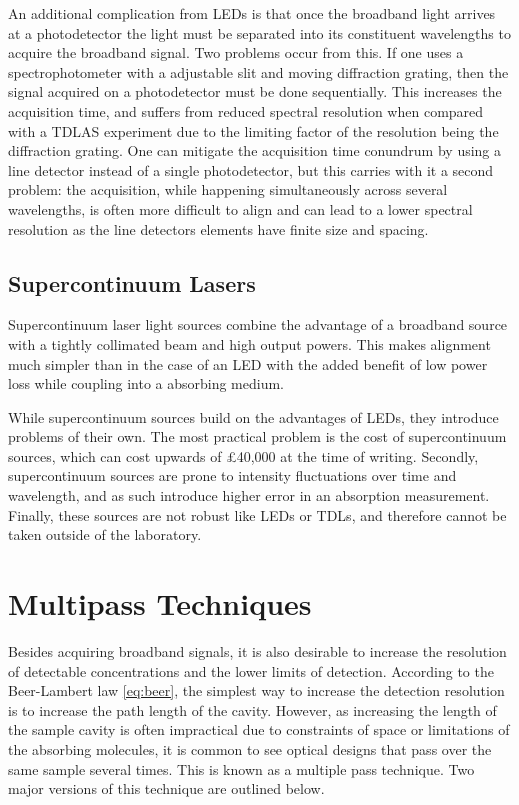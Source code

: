 An additional complication from \acp{LED} is that once the broadband light
arrives at a photodetector the light must be separated into its constituent
wavelengths to acquire the broadband signal.  Two problems occur from this. If
one uses a spectrophotometer with a adjustable slit and moving diffraction
grating, then the signal acquired on a photodetector must be done
sequentially.  This increases the acquisition time, and suffers from reduced
spectral resolution when compared with a \ac{TDLAS} experiment due to the
limiting factor of the resolution being the diffraction grating. One can
mitigate the acquisition time conundrum by using a line detector instead of a
single photodetector, but this carries with it a second problem: the
acquisition, while happening simultaneously across several wavelengths, is
often more difficult to align and can lead to a lower spectral resolution as the line detectors elements have finite size and spacing.

\subsection{Supercontinuum Lasers}\label{subsec:super}

Supercontinuum laser light sources combine the advantage of a broadband source
with a tightly collimated beam and high output powers. This makes alignment
much simpler than in the case of an \ac{LED} with the added benefit of low
power loss while coupling into a absorbing medium.

While supercontinuum sources build on the advantages of \acp{LED}, they
introduce problems of their own. The most practical problem is the cost of
supercontinuum sources, which can cost upwards of \pounds40,000 at the time of
writing. Secondly, supercontinuum sources are prone to intensity fluctuations
over time and wavelength, and as such introduce higher error in an absorption
measurement.  Finally, these sources are not robust like \acp{LED} or
\acp{TDL}, and therefore cannot be taken outside of the laboratory.

\section{Multipass Techniques}\label{sec:multipass}

Besides acquiring broadband signals, it is also desirable to increase the
resolution of detectable concentrations and the lower limits of detection.
According to the Beer-Lambert law \eqref{eq:beer}, the simplest way to increase
the detection resolution is to increase the path length of the cavity. However,
as increasing the length of the sample cavity is often impractical due to
constraints of space or limitations of the absorbing molecules, it is common to
see optical designs that pass over the same sample several times. This is known
as a multiple pass technique. Two major versions of this technique are outlined
below.

